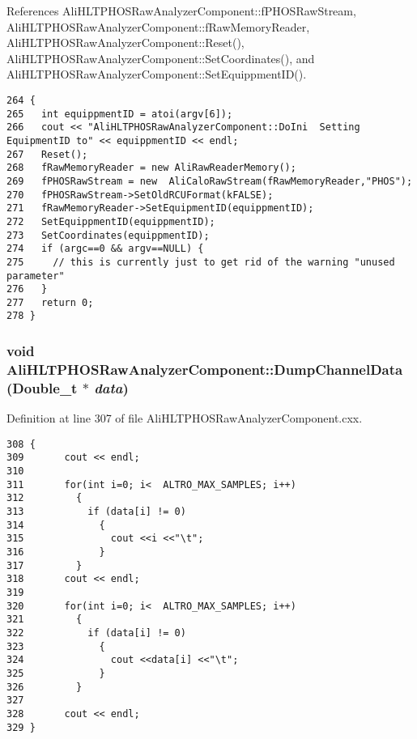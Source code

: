 References Ali\-HLTPHOSRaw\-Analyzer\-Component::f\-PHOSRaw\-Stream, Ali\-HLTPHOSRaw\-Analyzer\-Component::f\-Raw\-Memory\-Reader, Ali\-HLTPHOSRaw\-Analyzer\-Component::Reset(), Ali\-HLTPHOSRaw\-Analyzer\-Component::Set\-Coordinates(), and Ali\-HLTPHOSRaw\-Analyzer\-Component::Set\-Equippment\-ID().

\footnotesize\begin{verbatim}264 {
265   int equippmentID = atoi(argv[6]);
266   cout << "AliHLTPHOSRawAnalyzerComponent::DoIni  Setting EquipmentID to" << equippmentID << endl;
267   Reset();
268   fRawMemoryReader = new AliRawReaderMemory();
269   fPHOSRawStream = new  AliCaloRawStream(fRawMemoryReader,"PHOS");
270   fPHOSRawStream->SetOldRCUFormat(kFALSE);
271   fRawMemoryReader->SetEquipmentID(equippmentID); 
272   SetEquippmentID(equippmentID);
273   SetCoordinates(equippmentID);
274   if (argc==0 && argv==NULL) {
275     // this is currently just to get rid of the warning "unused parameter"
276   }
277   return 0;
278 }
\end{verbatim}\normalsize 


\subsubsection{\setlength{\rightskip}{0pt plus 5cm}void Ali\-HLTPHOSRaw\-Analyzer\-Component::Dump\-Channel\-Data (Double\_\-t $\ast$ {\em data})\hspace{0.3cm}{\tt  [inherited]}}\label{classAliHLTPHOSRawAnalyzerComponent_AliHLTPHOSRawAnalyzerPeakFinderComponenta9}




Definition at line 307 of file Ali\-HLTPHOSRaw\-Analyzer\-Component.cxx.

\footnotesize\begin{verbatim}308 {
309       cout << endl;
310       
311       for(int i=0; i<  ALTRO_MAX_SAMPLES; i++)
312         {
313           if (data[i] != 0)
314             {
315               cout <<i <<"\t";
316             }
317         }
318       cout << endl;
319       
320       for(int i=0; i<  ALTRO_MAX_SAMPLES; i++)
321         {
322           if (data[i] != 0)
323             {
324               cout <<data[i] <<"\t";
325             }
326         }
327       
328       cout << endl;
329 }
\end{verbatim}\normalsize 


